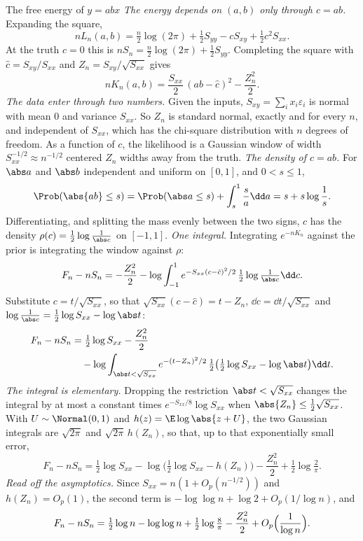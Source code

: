 \begin{refsection}
\begin{computation}{The free energy of $y=abx$}\label{comp:coefficient:product}
\step \emph{The energy depends on $(a,b)$ only through $c=ab$.} Expanding the square,
\[
nL_n(a,b)=\tfrac n2\log(2\pi)+\tfrac12S_{yy}-cS_{xy}+\tfrac12c^2S_{xx}.
\]
At the truth $c=0$ this is $nS_n=\tfrac n2\log(2\pi)+\tfrac12S_{yy}$. Completing the square with $\hat c=S_{xy}/S_{xx}$ and $Z_n=S_{xy}/\sqrt{S_{xx}}$ gives
\[
nK_n(a,b)=\frac{S_{xx}}2\,(ab-\hat c)^2-\frac{Z_n^2}2.
\]
\step \emph{The data enter through two numbers.} Given the inputs, $S_{xy}=\sum_ix_i\varepsilon_i$ is normal with mean $0$ and variance $S_{xx}$. So $Z_n$ is standard normal, exactly and for every $n$, and independent of $S_{xx}$, which has the chi-square distribution with $n$ degrees of freedom. As a function of $c$, the likelihood is a Gaussian window of width $S_{xx}^{-1/2}\approx n^{-1/2}$ centered $Z_n$ widths away from the truth.
\step \emph{The density of $c=ab$.} For $\abs a$ and $\abs b$ independent and uniform on $[0,1]$, and $0<s\le1$,
\[
\Prob(\abs{ab}\le s)=\Prob(\abs a\le s)+\int_s^1\frac sa\dd a=s+s\log\frac1s.
\]
Differentiating, and splitting the mass evenly between the two signs, $c$ has the density $\rho(c)=\tfrac12\log\frac1{\abs c}$ on $[-1,1]$.
\step \emph{One integral.} Integrating $e^{-nK_n}$ against the prior is integrating the window against $\rho$:
\[
F_n-nS_n=-\frac{Z_n^2}2-\log\int_{-1}^1e^{-S_{xx}(c-\hat c)^2/2}\,\tfrac12\log\tfrac1{\abs c}\dd c.
\]
Substitute $c=t/\sqrt{S_{xx}}$, so that $\sqrt{S_{xx}}(c-\hat c)=t-Z_n$, $\dd c=\dd t/\sqrt{S_{xx}}$ and $\log\frac1{\abs c}=\tfrac12\log S_{xx}-\log\abs t$:
\begin{align*}
F_n-nS_n&=\tfrac12\log S_{xx}-\frac{Z_n^2}2\\
&\quad-\log\int_{\abs t<\sqrt{S_{xx}}}e^{-(t-Z_n)^2/2}\,\tfrac12\bigl(\tfrac12\log S_{xx}-\log\abs t\bigr)\dd t.
\end{align*}
\step \emph{The integral is elementary.} Dropping the restriction $\abs t<\sqrt{S_{xx}}$ changes the integral by at most a constant times $e^{-S_{xx}/8}\log S_{xx}$ when $\abs{Z_n}\le\frac12\sqrt{S_{xx}}$. With $U\sim\Normal(0,1)$ and $h(z)=\E\log\abs{z+U}$, the two Gaussian integrals are $\sqrt{2\pi}$ and $\sqrt{2\pi}\,h(Z_n)$, so that, up to that exponentially small error,
\[
F_n-nS_n=\tfrac12\log S_{xx}-\log\bigl(\tfrac12\log S_{xx}-h(Z_n)\bigr)-\frac{Z_n^2}2+\tfrac12\log\tfrac2\pi.
\]
\step \emph{Read off the asymptotics.} Since $S_{xx}=n(1+O_p(n^{-1/2}))$ and $h(Z_n)=O_p(1)$, the second term is $-\log\log n+\log2+O_p(1/\log n)$, and
\[
F_n-nS_n=\tfrac12\log n-\log\log n+\tfrac12\log\tfrac8\pi-\frac{Z_n^2}2+O_p\Bigl(\frac1{\log n}\Bigr).
\]
\end{computation}


\end{refsection}
